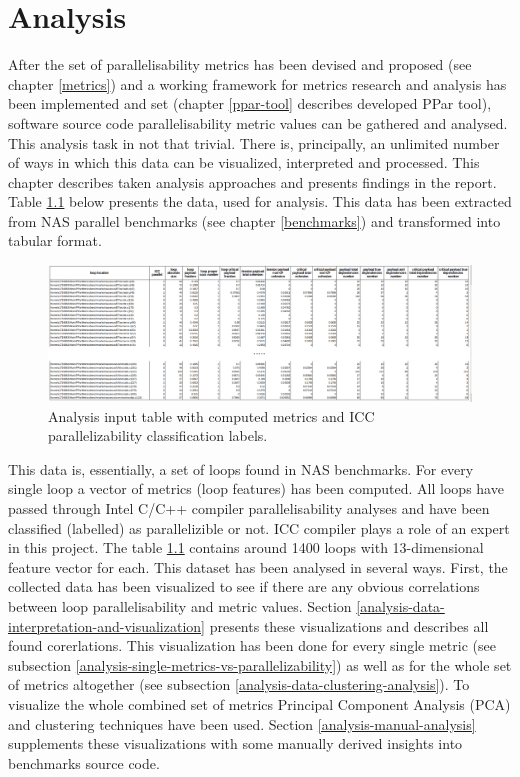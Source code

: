 \chapter{Analysis}
\null\qquad After the set of parallelisability metrics has been devised and proposed (see chapter \ref{metrics}) and a working framework for metrics research and analysis has been implemented and set (chapter \ref{ppar-tool} describes developed PPar tool), software source code parallelisability metric values can be gathered and analysed. This analysis task in not that trivial. There is, principally, an unlimited number of ways in which this data can be visualized, interpreted and processed. This chapter describes taken analysis approaches and presents findings in the report.\newline
\null\qquad Table \ref{analysis-data-table} below presents the data, used for analysis. This data has been extracted from NAS parallel benchmarks (see chapter \ref{benchmarks}) and transformed into tabular format.
\begin{figure}[htb]
\centering
\includegraphics[width=\linewidth]{figs/metrics-table.png}
\caption{Analysis input table with computed metrics and ICC parallelizability classification labels.}
\label{analysis-data-table}
\end{figure} \newline
\null\qquad This data is, essentially, a set of loops found in NAS benchmarks. For every single loop a vector of metrics (loop features) has been computed. All loops have passed through Intel C/C++ compiler parallelisability analyses and have been classified (labelled) as parallelizible or not. ICC compiler plays a role of an expert in this project. The table \ref{analysis-data-table} contains around 1400 loops with 13-dimensional feature vector for each.\newline 
\null\qquad This dataset has been analysed in several ways. First, the collected data has been visualized to see if there are any obvious correlations between loop parallelisability and metric values. Section \ref{analysis-data-interpretation-and-visualization} presents these visualizations and describes all found corerlations. This visualization has been done for every single metric (see subsection \ref{analysis-single-metrics-vs-parallelizability}) as well as for the whole set of metrics altogether (see subsection \ref{analysis-data-clustering-analysis}). To visualize the whole combined set of metrics Principal Component Analysis (PCA) and clustering techniques have been used. Section \ref{analysis-manual-analysis} supplements these visualizations with some manually derived insights into benchmarks source code. \newline 
